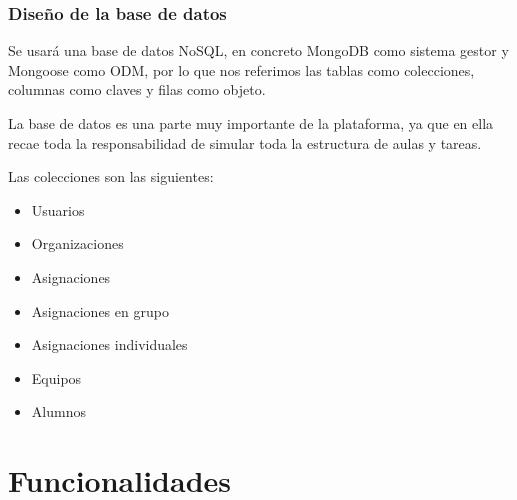 \documentclass{beamer}
\begin{document}
\begin{frame}[allowframebreaks]
\frametitle{Diseño de la base de datos}

  Se usará una base de datos NoSQL, en concreto MongoDB como sistema gestor y Mongoose como ODM, 
  por lo que nos referimos las tablas como colecciones, columnas como claves y filas como objeto.
  
  \bigskip
  
  La base de datos es una parte muy importante de la plataforma, ya que en ella recae toda 
  la responsabilidad de simular toda la estructura de aulas y tareas.

  \framebreak

    Las colecciones son las siguientes:

    \begin{itemize}
      \item Usuarios
      \item Organizaciones
      \item Asignaciones
      \item Asignaciones en grupo
      \item Asignaciones individuales
      \item Equipos
      \item Alumnos
    \end{itemize}

\end{frame}


\section{Funcionalidades}
\end{document}
